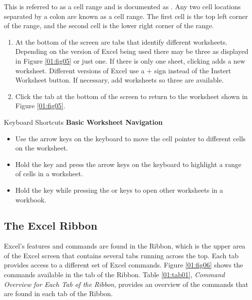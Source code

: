 This is referred to as a cell range and is documented as  . Any two cell locations separated by a colon are known as a cell range. The first cell is the top left corner of the range, and the second cell is the lower right corner of the range.

\begin{enumerate}
	\item At the bottom of the screen are tabs that identify different worksheets. Depending on the version of Excel being used there may be three as displayed in Figure \ref{01:fig05} or just one. If there is only one sheet, clicking  adds a new worksheet. Different versions of Excel use a $ + $ sign instead of the Instert Worksheet button. If necessary, add worksheets so three are available.
	\item Click the  tab at the bottom of the screen to return to the worksheet shown in Figure \ref{01:fig05}.
\end{enumerate}

\begin{center}
	\begin{shtcutbox}{Keyboard Shortcuts}
		\textbf{Basic Worksheet Navigation}
		\\
		\begin{itemize}
			\setlength{\itemsep}{0pt}
			\setlength{\parskip}{0pt}
			\setlength{\parsep}{0pt}

			\item Use the arrow keys on the keyboard to move the cell pointer to different cells on the worksheet.
			\item Hold the  key and press the arrow keys on the keyboard to highlight a range of cells in a worksheet.
			\item Hold the  key while pressing the  or  keys to open other worksheets in a workbook.

		\end{itemize}
	\end{shtcutbox}
\end{center}

\subsection{The Excel Ribbon}

Excel's features and commands are found in the Ribbon, which is the upper area of the Excel screen that contains several tabs running across the top. Each tab provides access to a different set of Excel commands. Figure \ref{01:fig06} shows the commands available in the  tab of the Ribbon. Table \ref{01:tab01}, \textit{Command Overview for Each Tab of the Ribbon}, provides an overview of the commands that are found in each tab of the Ribbon.

